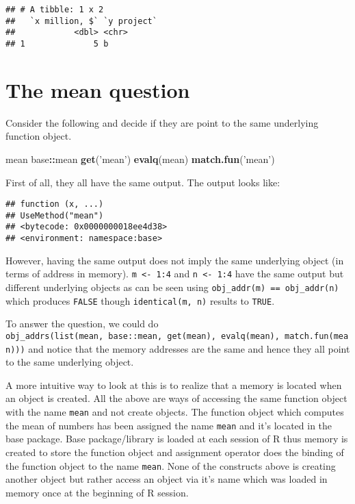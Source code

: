 \documentclass[]{book}
\newenvironment{Shaded}{\begin{snugshade}}{\end{snugshade}}
\newcommand{\KeywordTok}[1]{\textcolor[rgb]{0.13,0.29,0.53}{\textbf{#1}}}
\newcommand{\NormalTok}[1]{#1}
\newcommand{\OperatorTok}[1]{\textcolor[rgb]{0.81,0.36,0.00}{\textbf{#1}}}
\newcommand{\StringTok}[1]{\textcolor[rgb]{0.31,0.60,0.02}{#1}}
\begin{document}
\begin{verbatim}
## # A tibble: 1 x 2
##   `x million, $` `y project`
##            <dbl> <chr>      
## 1              5 b
\end{verbatim}

\hypertarget{the-mean-question}{%
\section{The mean question}\label{the-mean-question}}

Consider the following and decide if they are point to the same underlying function object.

\begin{Shaded}
\begin{Highlighting}[]
\NormalTok{mean}
\NormalTok{base}\OperatorTok{::}\NormalTok{mean}
\KeywordTok{get}\NormalTok{(}\StringTok{'mean'}\NormalTok{)}
\KeywordTok{evalq}\NormalTok{(mean)}
\KeywordTok{match.fun}\NormalTok{(}\StringTok{'mean'}\NormalTok{)}
\end{Highlighting}
\end{Shaded}

First of all, they all have the same output. The output looks like:

\begin{verbatim}
## function (x, ...) 
## UseMethod("mean")
## <bytecode: 0x0000000018ee4d38>
## <environment: namespace:base>
\end{verbatim}

However, having the same output does not imply the same underlying object (in terms of address in memory). \texttt{m\ \textless{}-\ 1:4} and \texttt{n\ \textless{}-\ 1:4} have the same output but different underlying objects as can be seen using \texttt{obj\_addr(m)\ ==\ obj\_addr(n)} which produces \texttt{FALSE} though \texttt{identical(m,\ n)} results to \texttt{TRUE}.

To answer the question, we could do \texttt{obj\_addrs(list(mean,\ base::mean,\ get(\textquotesingle{}mean\textquotesingle{}),\ evalq(mean),\ match.fun(\textquotesingle{}mean\textquotesingle{})))} and notice that the memory addresses are the same and hence they all point to the same underlying object.

A more intuitive way to look at this is to realize that a memory is located when an object is created. All the above are ways of accessing the same function object with the name \texttt{mean} and not create objects. The function object which computes the mean of numbers has been assigned the name \texttt{mean} and it's located in the base package. Base package/library is loaded at each session of R thus memory is created to store the function object and assignment operator does the binding of the function object to the name \texttt{mean}. None of the constructs above is creating another object but rather access an object via it's name which was loaded in memory once at the beginning of R session.
\end{document}
